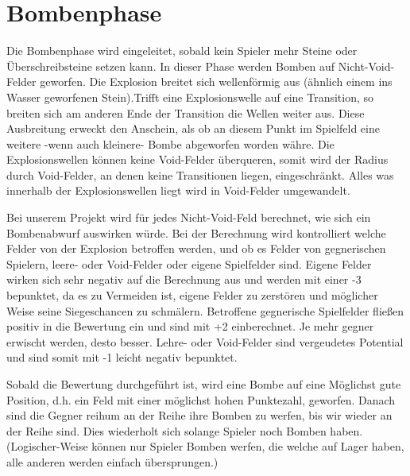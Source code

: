 \documentclass[12pt,a4paper]{article}
\begin{document}
\newpage
\section{Bombenphase}
Die Bombenphase wird eingeleitet, sobald kein Spieler mehr Steine oder Überschreibsteine setzen kann. In dieser Phase werden Bomben auf Nicht-Void-Felder geworfen. Die Explosion breitet sich wellenförmig aus (ähnlich einem ins Wasser geworfenen Stein).Trifft eine Explosionswelle auf eine Transition, so breiten sich am anderen Ende der Transition die Wellen weiter aus. Diese Ausbreitung erweckt den Anschein, als ob an diesem Punkt im Spielfeld eine weitere -wenn auch kleinere- Bombe abgeworfen worden währe. Die Explosionswellen können keine Void-Felder überqueren, somit wird der Radius durch Void-Felder, an denen keine Transitionen liegen, eingeschränkt. Alles was innerhalb der Explosionswellen liegt wird in Void-Felder umgewandelt.

Bei unserem Projekt wird für jedes Nicht-Void-Feld berechnet, wie sich ein Bombenabwurf auswirken würde. Bei der Berechnung wird kontrolliert welche Felder von der Explosion betroffen werden, und ob es Felder von gegnerischen Spielern, leere- oder Void-Felder oder eigene Spielfelder sind. Eigene Felder wirken sich sehr negativ auf die Berechnung aus und werden mit einer -3 bepunktet, da es zu Vermeiden ist, eigene Felder zu zerstören und möglicher Weise seine Siegeschancen zu schmälern. Betroffene gegnerische Spielfelder fließen positiv in die Bewertung ein und sind mit +2 einberechnet. Je mehr gegner erwischt werden, desto besser. Lehre- oder Void-Felder sind vergeudetes Potential und sind somit mit -1 leicht negativ bepunktet.

Sobald die Bewertung durchgeführt ist, wird eine Bombe auf eine Möglichst gute Position, d.h. ein Feld mit einer möglichst hohen Punktezahl, geworfen. Danach sind die Gegner reihum an der Reihe ihre Bomben zu werfen, bis wir wieder an der Reihe sind. Dies wiederholt sich solange Spieler noch Bomben haben. (Logischer-Weise können nur Spieler Bomben werfen, die welche auf Lager haben, alle anderen werden einfach übersprungen.)
\newpage
\end{document}
